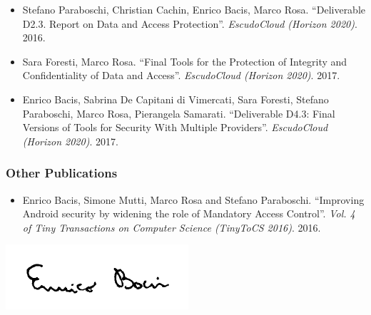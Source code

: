 \documentclass[a4paper]{article}
\begin{document}
\begin{sloppy}
\begin{itemize}
		\item Stefano Paraboschi, Christian Cachin, Enrico Bacis, Marco Rosa. ``Deliverable D2.3. Report on Data and Access Protection''. {\em EscudoCloud (Horizon 2020)}. 2016.
		
		\item Sara Foresti, Marco Rosa. ``Final Tools for the Protection of Integrity and Confidentiality of Data and Access''. {\em EscudoCloud (Horizon 2020)}. 2017.
		
		\item Enrico Bacis,	Sabrina De Capitani di Vimercati, Sara Foresti,	Stefano Paraboschi,	Marco Rosa,	Pierangela Samarati. ``Deliverable D4.3: Final Versions of Tools for Security With Multiple Providers''. {\em EscudoCloud (Horizon 2020)}. 2017.
		
	\end{itemize}
	
	\subsubsection*{Other Publications}
	\begin{itemize}
		\item Enrico Bacis, Simone Mutti, Marco Rosa and Stefano Paraboschi. ``Improving Android security by widening the role of Mandatory Access Control''. {\em Vol. 4 of Tiny Transactions on Computer Science (TinyToCS 2016)}. 2016.	
	\end{itemize}
\end{sloppy}


\vspace{10pt}
\includegraphics[right]{signature}
\end{document}
